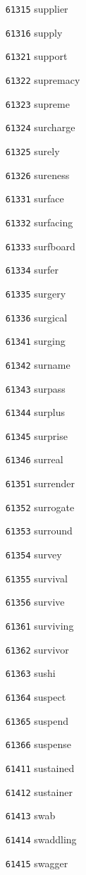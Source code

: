 \documentclass[twoside,11pt]{article}
\begin{document}
\begin{multicols}{5}
\begin{enumerate}
\item[\texttt{61315}] supplier
\item[\texttt{61316}] supply
\item[\texttt{61321}] support
\item[\texttt{61322}] supremacy
\item[\texttt{61323}] supreme
\item[\texttt{61324}] surcharge
\item[\texttt{61325}] surely
\item[\texttt{61326}] sureness
\item[\texttt{61331}] surface
\item[\texttt{61332}] surfacing
\item[\texttt{61333}] surfboard
\item[\texttt{61334}] surfer
\item[\texttt{61335}] surgery
\item[\texttt{61336}] surgical
\item[\texttt{61341}] surging
\item[\texttt{61342}] surname
\item[\texttt{61343}] surpass
\item[\texttt{61344}] surplus
\item[\texttt{61345}] surprise
\item[\texttt{61346}] surreal
\item[\texttt{61351}] surrender
\item[\texttt{61352}] surrogate
\item[\texttt{61353}] surround
\item[\texttt{61354}] survey
\item[\texttt{61355}] survival
\item[\texttt{61356}] survive
\item[\texttt{61361}] surviving
\item[\texttt{61362}] survivor
\item[\texttt{61363}] sushi
\item[\texttt{61364}] suspect
\item[\texttt{61365}] suspend
\item[\texttt{61366}] suspense
\item[\texttt{61411}] sustained
\item[\texttt{61412}] sustainer
\item[\texttt{61413}] swab
\item[\texttt{61414}] swaddling
\item[\texttt{61415}] swagger

\end{enumerate}
\end{multicols}
\end{document}

